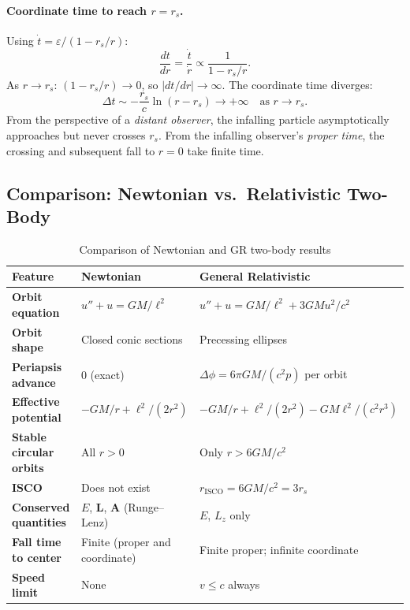 \documentclass[12pt,a4paper]{article}
\theoremstyle{plain}
\theoremstyle{definition}
\theoremstyle{remark}
\newcommand{\ve}[1]{\mathbf{#1}}           %
\newcommand{\leff}{\ell}  %
\begin{document}
\paragraph{Coordinate time to reach $r=r_s$.}
Using $\dot{t} = \varepsilon/(1-r_s/r)$:
\[
  \frac{dt}{dr} = \frac{\dot{t}}{\dot{r}} \propto \frac{1}{1-r_s/r}.
\]
As $r\to r_s$: $(1-r_s/r)\to0$, so $|dt/dr|\to\infty$. The coordinate time diverges:
\[
  \Delta t \sim -\frac{r_s}{c}\ln(r-r_s) \to +\infty \quad\text{as }r\to r_s.
\]
From the perspective of a \textit{distant observer}, the infalling particle asymptotically approaches but never crosses $r_s$. From the infalling observer's \textit{proper time}, the crossing and subsequent fall to $r=0$ take finite time.

\subsection{Comparison: Newtonian vs.\ Relativistic Two-Body}

\begin{table}[h]
\centering
\caption{Comparison of Newtonian and GR two-body results}
\renewcommand{\arraystretch}{1.5}
\begin{tabular}{>{\bfseries}p{4cm} p{5cm} p{5.5cm}}
  \toprule
  Feature & Newtonian & General Relativistic \\
  \midrule
  Orbit equation
    & $u''+u = GM/\leff^2$
    & $u''+u = GM/\leff^2 + 3GMu^2/c^2$ \\
  Orbit shape
    & Closed conic sections
    & Precessing ellipses \\
  Periapsis advance
    & $0$ (exact)
    & $\Delta\phi = 6\pi GM/(c^2 p)$ per orbit \\
  Effective potential
    & $-GM/r + \leff^2/(2r^2)$
    & $-GM/r + \leff^2/(2r^2) - GM\leff^2/(c^2r^3)$ \\
  Stable circular orbits
    & All $r>0$
    & Only $r>6GM/c^2$ \\
  ISCO
    & Does not exist
    & $r_{\mathrm{ISCO}} = 6GM/c^2 = 3r_s$ \\
  Conserved quantities
    & $E$, $\ve{L}$, $\ve{A}$ (Runge--Lenz)
    & $E$, $L_z$ only \\
  Fall time to center
    & Finite (proper and coordinate)
    & Finite proper; infinite coordinate \\
  Speed limit
    & None
    & $v\leq c$ always \\
  \bottomrule
\end{tabular}
\end{table}
\end{document}
